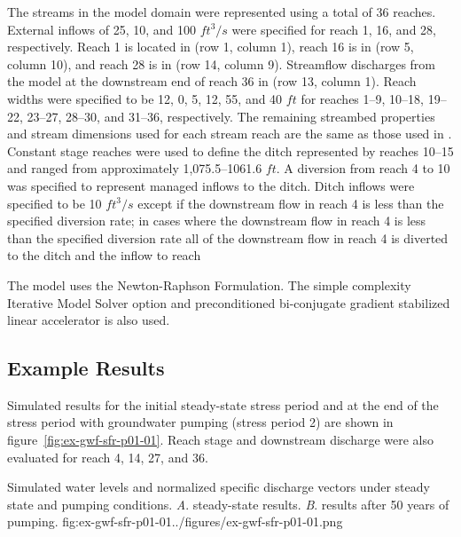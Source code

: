 The streams in the model domain were represented using a total of 36 reaches. External inflows of 25, 10, and 100 $ft^{3}/s$ were specified for reach 1, 16, and 28, respectively. Reach 1 is located in (row 1, column 1), reach 16 is in (row 5, column 10), and reach 28 is in (row 14, column 9). Streamflow discharges from the model at the downstream end of reach 36 in (row 13, column 1). Reach widths were specified to be 12, 0, 5, 12, 55, and 40 $ft$ for reaches 1--9, 10--18, 19--22, 23--27, 28--30, and 31--36, respectively. The remaining streambed properties and stream dimensions used for each stream reach are the same as those used in 
 \cite{modflowsfr1pack} \cite[see][Table~1]{modflowsfr1pack}. Constant stage reaches were used to define the ditch represented by reaches 10--15 and ranged from approximately 1,075.5--1061.6 $ft$. A diversion from reach 4 to 10 was specified to represent managed inflows to the ditch. Ditch inflows were specified to be 10 $ft^{3}/s$ except if the downstream flow in reach 4 is less than the specified diversion rate; in cases where the downstream flow in reach 4 is less than the specified diversion rate all of the downstream flow in reach 4 is diverted to the ditch and the inflow to reach

The model uses the Newton-Raphson Formulation. The simple complexity Iterative Model Solver option and preconditioned bi-conjugate gradient stabilized linear accelerator is also used.

\subsection{Example Results}

Simulated results for the initial steady-state stress period and at the end of the stress period with groundwater pumping (stress period 2) are shown in figure~\ref{fig:ex-gwf-sfr-p01-01}. Reach stage and downstream discharge were also evaluated for reach 4, 14, 27, and 36.

\begin{StandardFigure}{
                                     Simulated water levels and normalized specific discharge vectors  
                                     under steady state and pumping conditions. 
                                     \textit{A}. steady-state results.
                                     \textit{B}. results after 50 years of pumping.
                                     }{fig:ex-gwf-sfr-p01-01}{../figures/ex-gwf-sfr-p01-01.png}
\end{StandardFigure}                                 

